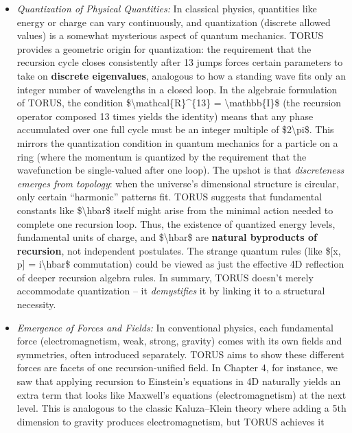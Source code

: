 \begin{itemize}
\item
  \emph{Quantization of Physical Quantities:} In classical physics,
  quantities like energy or charge can vary continuously, and
  quantization (discrete allowed values) is a somewhat mysterious aspect
  of quantum mechanics. TORUS provides a geometric origin for
  quantization: the requirement that the recursion cycle closes
  consistently after 13 jumps forces certain parameters to take on
  \textbf{discrete eigenvalues}, analogous to how a standing wave fits
  only an integer number of wavelengths in a closed loop​. In the
  algebraic formulation of TORUS, the condition
  \$\textbackslash{}mathcal\{R\}\^{}\{13\} =
  \textbackslash{}mathbb\{I\}\$ (the recursion operator composed 13
  times yields the identity) means that any phase accumulated over one
  full cycle must be an integer multiple of \$2\textbackslash{}pi\$​.
  This mirrors the quantization condition in quantum mechanics for a
  particle on a ring (where the momentum is quantized by the requirement
  that the wavefunction be single-valued after one loop)​. The upshot is
  that \emph{discreteness emerges from topology}: when the universe's
  dimensional structure is circular, only certain ``harmonic'' patterns
  fit. TORUS suggests that fundamental constants like
  \$\textbackslash{}hbar\$ itself might arise from the minimal action
  needed to complete one recursion loop​. Thus, the existence of
  quantized energy levels, fundamental units of charge, and
  \$\textbackslash{}hbar\$ are \textbf{natural byproducts of recursion},
  not independent postulates​. The strange quantum rules (like \${[}x,
  p{]} = i\textbackslash{}hbar\$ commutation) could be viewed as just
  the effective 4D reflection of deeper recursion algebra rules​. In
  summary, TORUS doesn't merely accommodate quantization -- it
  \emph{demystifies} it by linking it to a structural necessity.
\item
  \emph{Emergence of Forces and Fields:} In conventional physics, each
  fundamental force (electromagnetism, weak, strong, gravity) comes with
  its own fields and symmetries, often introduced separately. TORUS aims
  to show these different forces are facets of one recursion-unified
  field. In Chapter 4, for instance, we saw that applying recursion to
  Einstein's equations in 4D naturally yields an extra term that looks
  like Maxwell's equations (electromagnetism) at the next level​. This
  is analogous to the classic Kaluza--Klein theory where adding a 5th
  dimension to gravity produces electromagnetism, but TORUS achieves it

\end{itemize}
